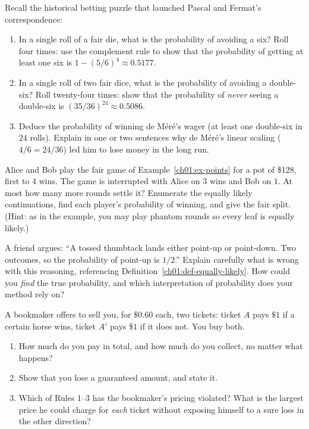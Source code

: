 \begin{exercise}
\label{ch01:ex-demere}
Recall the historical betting puzzle that launched Pascal and Fermat's
correspondence:
\begin{enumerate}
\item In a single roll of a fair die, what is the probability of avoiding a six?
Roll four times: use the complement rule to show that the probability of getting
at least one six is $1 - (5/6)^4 \approx 0.5177$.
\item In a single roll of two fair dice, what is the probability of avoiding a
double-six? Roll twenty-four times: show that the probability of \emph{never}
seeing a double-six is $(35/36)^{24} \approx 0.5086$.
\item Deduce the probability of winning de M\'er\'e's wager (at least one
double-six in $24$ rolls). Explain in one or two sentences why de M\'er\'e's
linear scaling ($4/6 = 24/36$) led him to lose money in the long run.
\end{enumerate}
\end{exercise}

\begin{exercise}
\label{ch01:ex-points2}
Alice and Bob play the fair game of Example~\ref{ch01:ex-points} for a pot of
\$128, first to $4$ wins. The game is interrupted with Alice on $3$ wins and Bob on
$1$. At most how many more rounds settle it? Enumerate the equally likely
continuations, find each player's probability of winning, and give the fair split.
(Hint: as in the example, you may play phantom rounds so every leaf is equally
likely.)
\end{exercise}

\begin{exercise}
\label{ch01:ex-false-sym}
A friend argues: ``A tossed thumbtack lands either point-up or point-down. Two
outcomes, so the probability of point-up is $1/2$.'' Explain carefully what is
wrong with this reasoning, referencing Definition~\ref{ch01:def-equally-likely}.
How could you \emph{find} the true probability, and which interpretation of
probability does your method rely on?
\end{exercise}

\begin{exercise}
\label{ch01:ex-dutch}
A bookmaker offers to sell you, for $\$0.60$ each, two tickets: ticket $A$ pays
$\$1$ if a certain horse wins, ticket $A'$ pays $\$1$ if it does not. You buy both.
\begin{enumerate}
\item How much do you pay in total, and how much do you collect, no matter what
happens?
\item Show that you lose a guaranteed amount, and state it.
\item Which of Rules 1--3 has the bookmaker's pricing violated? What is the largest
price he could charge for \emph{each} ticket without exposing himself to a sure
loss in the other direction?
\end{enumerate}
\end{exercise}

